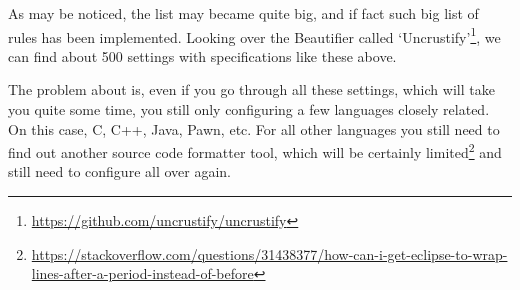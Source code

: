     As may be noticed, the list may became quite big,
    and if fact such big list of rules has been implemented.
    Looking over the Beautifier called
    `Uncrustify'\footnote{\url{https://github.com/uncrustify/uncrustify}},
    we can find about 500 settings with specifications like these above.

    The problem about is, even if you go through all these settings,
    which will take you quite some time,
    you still only configuring a few languages closely related.
    On this case, C, C++, Java, Pawn, etc.
    For all other languages you still need to find out another source code
    formatter tool, which will be certainly
    limited\footnote{\url{https://stackoverflow.com/questions/31438377/how-can-i-get-eclipse-to-wrap-lines-after-a-period-instead-of-before}}
    and still need to configure all over again.

